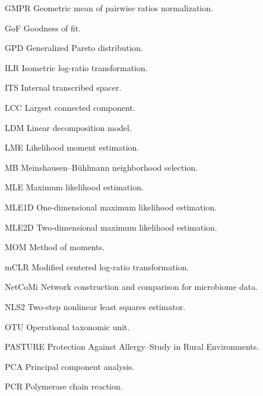 \begin{notationlist}
	\item[GMPR] Geometric mean of pairwise ratios normalization.
	
	\item[GoF] Goodness of fit.
	
	\item[GPD] Generalized Pareto distribution.
	
	\item[ILR] Isometric log-ratio transformation.
	
	\item[ITS] Internal transcribed spacer.
	
	\item[LCC] Largest connected component.
	
	\item[LDM] Linear decomposition model.
	
	\item[LME] Likelihood moment estimation.
	
	\item[MB] Meinshausen--Bühlmann neighborhood selection.
	
	\item[MLE] Maximum likelihood estimation.
	
	\item[MLE1D] One-dimensional maximum likelihood estimation.
	
	\item[MLE2D] Two-dimensional maximum likelihood estimation.
	
	\item[MOM] Method of moments.
	
	\item[mCLR] Modified centered log-ratio transformation.
	
	\item[NetCoMi] Network construction and comparison for microbiome data.
	
	\item[NLS2] Two-step nonlinear least squares estimator.
	
	\item[OTU] Operational taxonomic unit.
	
	\item[PASTURE] Protection Against Allergy--Study in Rural Environments.
	
	\item[PCA] Principal component analysis.
	
	\item[PCR] Polymerase chain reaction.
	

\end{notationlist}
